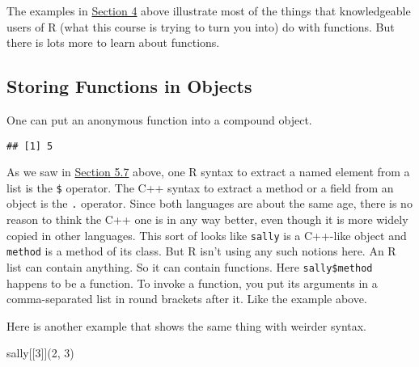 \documentclass[
]{article}
\newenvironment{Shaded}{\begin{snugshade}}{\end{snugshade}}
\newcommand{\AttributeTok}[1]{\textcolor[rgb]{0.77,0.63,0.00}{#1}}
\newcommand{\ControlFlowTok}[1]{\textcolor[rgb]{0.13,0.29,0.53}{\textbf{#1}}}
\newcommand{\DecValTok}[1]{\textcolor[rgb]{0.00,0.00,0.81}{#1}}
\newcommand{\FunctionTok}[1]{\textcolor[rgb]{0.00,0.00,0.00}{#1}}
\newcommand{\NormalTok}[1]{#1}
\newcommand{\OtherTok}[1]{\textcolor[rgb]{0.56,0.35,0.01}{#1}}
\newcommand{\SpecialCharTok}[1]{\textcolor[rgb]{0.00,0.00,0.00}{#1}}
\newcommand{\StringTok}[1]{\textcolor[rgb]{0.31,0.60,0.02}{#1}}
\begin{document}
The examples in \protect\hyperlink{functions}{Section 4} above
illustrate most of the things that knowledgeable users of R (what this
course is trying to turn you into) do with functions. But there is lots
more to learn about functions.

\hypertarget{storing-functions-in-objects}{%
\subsection{Storing Functions in
Objects}\label{storing-functions-in-objects}}

One can put an anonymous function into a compound object.

\begin{Shaded}
\end{Shaded}

\begin{verbatim}
## [1] 5
\end{verbatim}

As we saw in \protect\hyperlink{more-on-indexing}{Section 5.7} above,
one R syntax to extract a named element from a list is the \texttt{\$}
operator. The C++ syntax to extract a method or a field from an object
is the \texttt{.} operator. Since both languages are about the same age,
there is no reason to think the C++ one is in any way better, even
though it is more widely copied in other languages. This sort of looks
like \texttt{sally} is a C++-like object and \texttt{method} is a method
of its class. But R isn't using any such notions here. An R list can
contain anything. So it can contain functions. Here
\texttt{sally\$method} happens to be a function. To invoke a function,
you put its arguments in a comma-separated list in round brackets after
it. Like the example above.

Here is another example that shows the same thing with weirder syntax.

\begin{Shaded}
\begin{Highlighting}[]
\NormalTok{sally[[}\DecValTok{3}\NormalTok{]](}\DecValTok{2}\NormalTok{, }\DecValTok{3}\NormalTok{)}
\end{Highlighting}
\end{Shaded}
\end{document}
